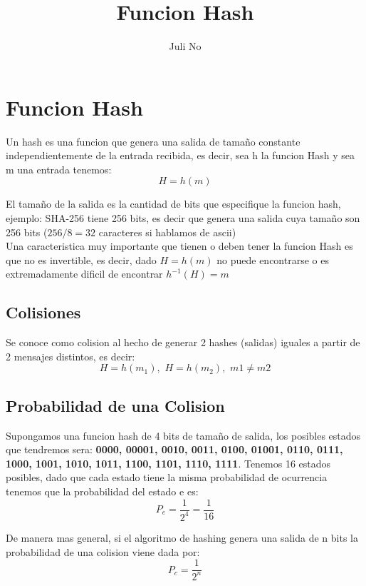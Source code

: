 \documentclass{article}
\title{Funcion Hash}
\author{Juli No}
\newcommand{\SP}{\,\,}
\begin{document}
\maketitle
\pagebreak

\section{Funcion Hash}
Un hash es una funcion que genera una salida de tamaño constante independientemente
de la entrada recibida, es decir, sea h la funcion Hash y sea
m una entrada tenemos:
$$
H = h(m)
$$

El tamaño de la salida es la cantidad de bits que especifique la funcion hash,
ejemplo: SHA-256 tiene 256 bits, es decir que genera una salida cuya tamaño son 256
bits ($256/8 = 32$ caracteres si hablamos de ascii)\\

Una caracteristica muy importante que tienen o deben tener la funcion Hash es que
no es invertible, es decir, dado $H = h(m)$ no puede encontrarse o es extremadamente
dificil de encontrar $h^{-1}(H) = m$

\subsection{Colisiones}
Se conoce como colision al hecho de generar 2 hashes (salidas) iguales a partir de 2 mensajes distintos,
es decir:
$$
H = h(m_{1}), \SP H = h(m_{2}), \SP m1 \neq m2
$$

\subsection{Probabilidad de una Colision}
Supongamos una funcion hash de 4 bits de tamaño de salida, los posibles estados
que tendremos sera: \textbf{0000, 00001, 0010, 0011, 0100, 01001, 0110, 0111, 1000,
1001, 1010, 1011, 1100, 1101, 1110, 1111}. Tenemos 16 estados posibles, dado que cada
estado tiene la misma probabilidad de ocurrencia tenemos que la probabilidad del estado
e es:
$$
P_{e} = \frac{1}{2^4} = \frac{1}{16}
$$

De manera mas general, si el algoritmo de hashing genera una salida de n bits
la probabilidad de una colision viene dada por:
$$
P_{c} = \frac{1}{2^n}
$$
\end{document}

